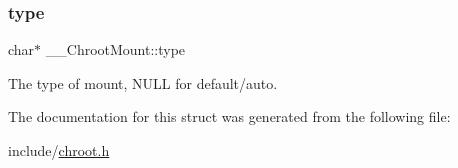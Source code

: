 \subsubsection{\texorpdfstring{type}{type}}
{\footnotesize\ttfamily char$\ast$ \+\_\+\+\_\+\+Chroot\+Mount\+::type}



The type of mount, N\+U\+LL for default/auto. 



The documentation for this struct was generated from the following file\+:\begin{DoxyCompactItemize}
\item 
include/\mbox{\hyperlink{chroot_8h}{chroot.\+h}}\end{DoxyCompactItemize}
